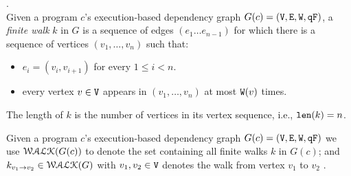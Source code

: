 \begin{defn}.
  \label{def:finitewalk}
  \\
  Given a program $c$'s execution-based dependency graph $G(c) = (\mathtt{V}, \mathtt{E}, \mathtt{W}, \mathtt{qF})$, 
  a \emph{finite walk} $k$ in $G$ is a sequence of edges $(e_1 \ldots e_{n - 1})$ 
  for which there is a sequence of vertices $(v_1, \ldots, v_{n})$ such that:
  \begin{itemize}
      \item $e_i = (v_{i},v_{i + 1})$ for every $1 \leq i < n$.
      \item every vertex $v \in \mathtt{V}$ appears in $(v_1, \ldots, v_{n})$ at most 
      $\mathtt{W}(v)$ times.  
  \end{itemize}
  The length of $k$ is the number of vertices in its vertex sequence, i.e., $\mathtt{len}(k) = n$.
  \end{defn}
%
Given 
a program $c$'s execution-based dependency graph $G(c) = (\mathtt{V}, \mathtt{E}, \mathtt{W}, \mathtt{qF})$
we use $\mathcal{WALK}(G(c))$ to denote 
the set containing all finite walks $k$ in $G(c)$;
and $k_{v_1 \to v_2} \in \mathcal{WALK}(G)$ with $v_1, v_2 \in \mathtt{V}$ denotes the walk from vertex $v_1$ to $v_2$ .
